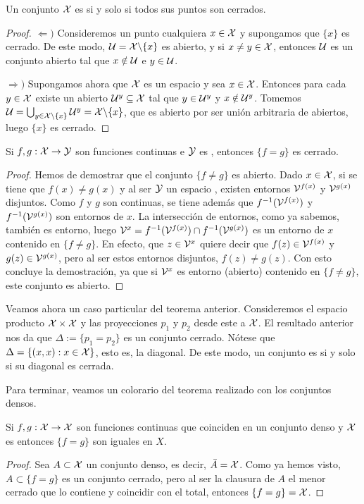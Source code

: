 \begin{prop}
	Un conjunto $\mathcal{X}$ es \frechet si y solo si todos sus puntos son cerrados.
	\begin{proof}
		$\Leftarrow)$ Consideremos un punto cualquiera $x\in \mathcal{X}$ y supongamos que $\{x\}$ es cerrado. De este modo, $\mathcal{U}=\mathcal{X}\backslash \{x\}$ es abierto, y si $x\neq y\in \mathcal{X}$, entonces $\mathcal{U}$ es un conjunto abierto tal que $x\notin \mathcal{U}$ e $y\in \mathcal{U}$.
		 
		$\Rightarrow)$ Supongamos ahora que $\mathcal{X}$ es un espacio \frechet y sea $x\in \mathcal{X}$. Entonces para cada $y\in \mathcal{X}$ existe un abierto $\mathcal{U}^y \subseteq \mathcal{X}$ tal que $y\in \mathcal{U}^y$ y $x\notin \mathcal{U}^y$. Tomemos $\mathcal{U}=\bigcup_{y\in \mathcal{X}\backslash\{x\}}\mathcal{U}^y=\mathcal{X}\backslash\{x\}$, que es abierto por ser unión arbitraria de abiertos, luego $\{x\}$ es cerrado. 
	\end{proof}
\end{prop}

\begin{theo}
	Si $f,g:\mathcal{X}\to \mathcal{Y}$ son funciones continuas e $\mathcal{Y}$ es \hausdorff, entonces $\{f=g\}$ es cerrado. 
	\begin{proof}
		Hemos de demostrar que el conjunto $\{f\neq g\}$ es abierto. Dado $x\in \mathcal{X}$, si se tiene que $f(x)\neq g(x)$ y al ser $\mathcal{Y}$ un espacio \hausdorff, existen entornos $\mathcal{V}^{f(x)}$ y $\mathcal{V}^{g(x)}$ disjuntos. Como $f$ y $g$ son continuas, se tiene además que $f^{-1}(\mathcal{V}^{f(x)})$ y $f^{-1}(\mathcal{V}^{g(x)})$ son entornos de $x$. La intersección de entornos, como ya sabemos, también es entorno, luego $\mathcal{V}^x=f^{-1}(\mathcal{V}^{f(x)})\cap f^{-1}(\mathcal{V}^{g(x)})$ es un entorno de $x$ contenido en $\{f\neq g\}$. En efecto, que $z\in \mathcal{V}^x$ quiere decir que $f(z)\in \mathcal{V}^{f(x)}$ y $g(z)\in \mathcal{V}^{g(x)}$, pero al ser estos entornos disjuntos, $f(z)\neq g(z)$. Con esto concluye la demostración, ya que si $\mathcal{V}^x$ es entorno (abierto) contenido en $\{f\neq g\}$, este conjunto es abierto.
	\end{proof}
\end{theo}

Veamos ahora un caso particular del teorema anterior. Consideremos el espacio producto $\mathcal{X}\times \mathcal{X}$ y las proyecciones $p_1$ y $p_2$ desde este a $\mathcal{X}$. El resultado anterior nos da que $\Delta:=\{p_1=p_2\}$ es un conjunto cerrado. Nótese que $\Delta=\{(x,x):x\in \mathcal{X}\}$, esto es, la diagonal. De este modo, un conjunto es \hausdorff si y solo si su diagonal es cerrada.

Para terminar, veamos un colorario del teorema realizado con los conjuntos densos.  

\begin{cor}
	Si $f,g:\mathcal{X}\to \mathcal{X}$ son funciones continuas que coinciden en un conjunto denso y $\mathcal{X}$ es \hausdorff entonces $\{f=g\}$ son iguales en $X$. 
	\begin{proof}
		Sea $A\subset \mathcal{X}$ un conjunto denso, es decir, $\bar{A}=\mathcal{X}$. Como ya hemos visto, $A\subset \{f=g\}$ es un conjunto cerrado, pero al ser la clausura de $A$ el menor cerrado que lo contiene y coincidir con el total, entonces $\{f=g\}=\mathcal{X}$.
	\end{proof}
\end{cor}

